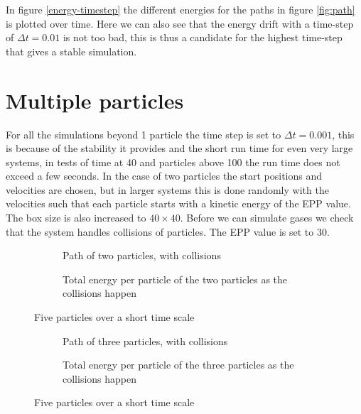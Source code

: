 \documentclass[10pt,a4paper,aps,twocolumn,secnumarabic,numerical,balancelastpage,nofootinbib,superscriptaddress]{revtex4-2}
\begin{document}
	In figure \ref{energy-timestep} the different energies for the paths in figure \ref{fig:path} is plotted over time. Here we can also see that the energy drift with a time-step of $\Delta t = 0.01$ is not too bad, this is thus a candidate for the highest time-step that gives a stable simulation.
	
	
	\section{Multiple particles}
	
		For all the simulations beyond 1 particle the time step is set to $\Delta t =0.001$, this is because of the stability it provides and the short run time for even very large systems, in tests of time at 40 and particles above 100 the run time does not exceed a few seconds. In the case of two particles the start positions and velocities are chosen, but in larger systems this is done randomly with the velocities such that each particle starts with a kinetic energy of the EPP value. The box size is also increased to $40\times40$. Before we can simulate gases we check that the system handles collisions of particles. The EPP value is set to 30.
		\begin{figure*}[htb]
			\centering
			\begin{subfigure}{.45\textwidth}
				\hspace*{-2cm}\scalebox{0.8}{}
				\caption{Path of two particles, with collisions}
			\end{subfigure}
			\begin{subfigure}{.45\textwidth}
				\scalebox{0.6}{}
				\caption{Total energy per particle of the two particles as the collisions happen}
			\end{subfigure}
			\caption{\label{two-collide}Five particles over a short time scale}
		\end{figure*}
		
		\begin{figure*}[htb]
			\centering
			\begin{subfigure}{.45\textwidth}
				\hspace*{-2cm}\scalebox{0.8}{}
				\caption{Path of three particles, with collisions}
			\end{subfigure}
			\begin{subfigure}{.45\textwidth}
				\scalebox{0.6}{}
				\caption{Total energy per particle of the three particles as the collisions happen}
			\end{subfigure}
			\caption{\label{three-collide}Five particles over a short time scale}
		\end{figure*}
		
\end{document}
